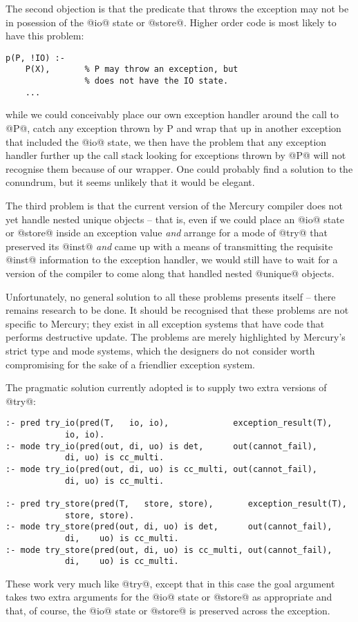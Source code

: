 The second objection is that the predicate that throws the exception may
not be in posession of the @io@ state or @store@.  Higher order code is
most likely to have this problem:
\begin{verbatim}
p(P, !IO) :-
    P(X),       % P may throw an exception, but
                % does not have the IO state.
    ...
\end{verbatim}
while we could conceivably place our own exception handler around the
call to @P@, catch any exception thrown by P and wrap that up in
another exception that included the @io@ state, we then have the
problem that any exception handler further up the call stack looking
for exceptions thrown by @P@ will not recognise them because of our
wrapper.  One could probably find a solution to the conundrum, but
it seems unlikely that it would be elegant.

The third problem is that the current version of the Mercury compiler
does not yet handle nested unique objects -- that is, even if we could
place an @io@ state or @store@ inside an exception value \emph{and}
arrange for a mode of @try@ that preserved its @inst@ \emph{and}
came up with a means of transmitting the requisite @inst@
information to the exception handler, we would still have to wait for
a version of the compiler to come along that handled nested @unique@
objects.  

Unfortunately, no general solution to all these problems presents
itself -- there remains research to be done.  It should be recognised
that these problems are not specific to Mercury; they exist in all
exception systems that have code that performs destructive update.
The problems are merely highlighted by Mercury's strict type and mode
systems, which the designers do not consider worth compromising for
the sake of a friendlier exception system.  

The pragmatic solution currently adopted is to supply two extra
versions of @try@:
\begin{verbatim}
:- pred try_io(pred(T,   io, io),             exception_result(T),
            io, io).
:- mode try_io(pred(out, di, uo) is det,      out(cannot_fail),
            di, uo) is cc_multi.
:- mode try_io(pred(out, di, uo) is cc_multi, out(cannot_fail),
            di, uo) is cc_multi.

:- pred try_store(pred(T,   store, store),       exception_result(T),
            store, store).
:- mode try_store(pred(out, di, uo) is det,      out(cannot_fail),
            di,    uo) is cc_multi.
:- mode try_store(pred(out, di, uo) is cc_multi, out(cannot_fail),
            di,    uo) is cc_multi.
\end{verbatim}
These work very much like @try@, except that in this case the goal
argument takes two extra arguments for the @io@ state or @store@ as
appropriate and that, of course, the @io@ state or @store@ is
preserved across the exception.

